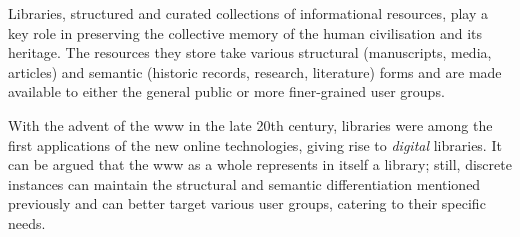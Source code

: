 Libraries, structured and curated collections of informational resources, play a key role in preserving the collective memory of the human civilisation and its heritage. The resources they store take various structural (manuscripts, media, articles) and semantic (historic records, research, literature) forms and are made available to either the general public or more finer-grained user groups.

With the advent of the \gls{www} in the late 20th century, libraries were among the first applications of the new online technologies, giving rise to \emph{digital} libraries. It can be argued that the \gls{www} as a whole represents in itself a library; still, discrete instances can maintain the structural and semantic differentiation mentioned previously and can better target various user groups, catering to their specific needs.


